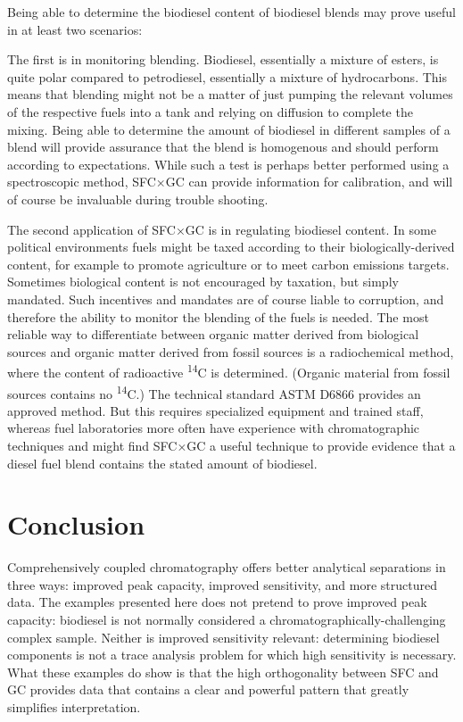Being able to determine the biodiesel content of biodiesel blends may prove
useful in at least two scenarios: 

The first is in monitoring blending. Biodiesel, essentially a mixture of esters,
is quite polar compared to petrodiesel, essentially a mixture of hydrocarbons.
This means that blending might not be a matter of just pumping the relevant volumes
of the respective fuels into a tank and relying on diffusion to complete the
mixing. Being able to determine the amount of biodiesel in different samples of
a blend will provide assurance that the blend is homogenous and should perform
according to expectations. While such a test is perhaps better performed using a
spectroscopic method, SFC×GC can provide information for calibration, and will
of course be invaluable during trouble shooting.

The second application of SFC×GC is in regulating biodiesel content. In some
political environments fuels might be taxed according to their
biologically-derived content, for example to promote agriculture or to meet
carbon emissions targets. Sometimes biological content is not encouraged by
taxation, but simply mandated. Such incentives and mandates are of course liable
to corruption, and therefore the ability to monitor the blending of the fuels is
needed. The most reliable way to differentiate between organic matter derived
from biological sources and organic matter derived from fossil sources is a
radiochemical method, where the content of radioactive \textsuperscript{14}C is
determined. (Organic material from fossil sources contains no
\textsuperscript{14}C.) The technical standard ASTM D6866 provides an approved
method. But this requires specialized equipment and trained staff, whereas fuel
laboratories more often have experience with chromatographic techniques and
might find SFC×GC a useful technique to provide evidence that a diesel fuel
blend contains the stated amount of biodiesel.

\section{Conclusion}

Comprehensively coupled chromatography offers better analytical separations in
three ways: improved peak capacity, improved sensitivity, and more structured
data. The examples presented here does not pretend to prove improved peak
capacity: biodiesel is not normally considered a chromatographically-challenging
complex sample. Neither is improved sensitivity relevant: determining biodiesel
components is not a trace analysis problem for which high sensitivity is
necessary. What these examples do show is that the high orthogonality between
SFC and GC provides data that contains a clear and powerful pattern that greatly
simplifies interpretation.


